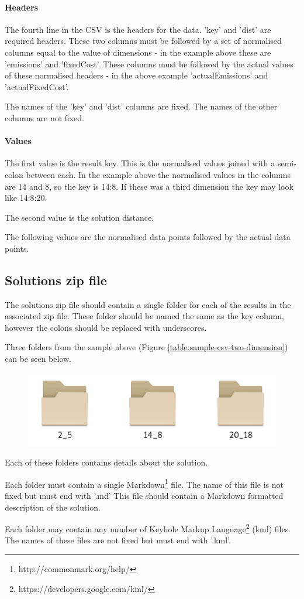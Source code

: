 \paragraph{Headers}  The fourth line in the CSV is the headers for the data.  'key' and 'dist' are required headers.  These two columns must be followed by a set of normalised columns equal to the value of dimensions - in the example above these are 'emissions' and 'fixedCost'.  These columns must be followed by the actual values of these normalised headers - in the above example 'actualEmissions' and 'actualFixedCost'.

The names of the 'key' and 'dist' columns are fixed.  The names of the other columns are not fixed.

\paragraph{Values}  The first value is the result key.  This is the normalised values joined with a semi-colon between each.  In the example above the normalised values in the columns are 14 and 8, so the key is 14:8.  If these was a third dimension the key may look like 14:8:20.

The second value is the solution distance.

The following values are the normalised data points followed by the actual data points.

\subsection{Solutions zip file}

The solutions zip file should contain a single folder for each of the results in the associated zip file.  These folder should be named the same as the key column, however the colons should be replaced with underscores.

Three folders from the sample above (Figure \ref{table:sample-csv-two-dimension}) can be seen below.

\begin{figure}[h]
	\includegraphics[width=\linewidth]{images/solution-zip-folders.png}
	\label{img:solution-zip-folders}
\end{figure}

Each of these folders contains details about the solution.

Each folder must contain a single Markdown\footnote{http://commonmark.org/help/} file.  The name of this file is not fixed but must end with '.md'  This file should contain a Markdown formatted description of the solution.

Each folder may contain any number of Keyhole Markup Language\footnote{https://developers.google.com/kml/} (kml) files.  The names of these files are not fixed but must end with '.kml'.
